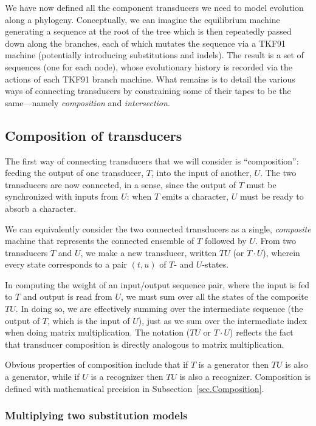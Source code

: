 \documentclass{article}
\newcommand{\secref}[1]{Subsection~\ref{sec.#1}}
\newcommand{\seclabel}[1]{\label{sec.#1}}
\begin{document}
We have now defined all the component transducers we need to model evolution along a phylogeny. 
Conceptually, we can imagine the equilibrium machine generating a sequence at the root of the
tree which is then repeatedly passed down along the branches, each of which mutates the sequence
via a TKF91 machine (potentially introducing substitutions and indels). 
The result is a set of sequences (one  for each node),
  whose evolutionary history is recorded via  
the actions of each TKF91  branch machine.  
What remains is to detail the various ways of connecting transducers by
 constraining some of their tapes to be the same---namely {\em composition} and {\em intersection}.

\subsection{Composition of transducers}
\seclabel{Tutorial.Composition}
The first way of connecting transducers that we will consider is  ``composition'':
feeding the output of one transducer, $T$, into the input of another, $U$.
The two transducers are now connected, in a sense, since the output of $T$ must be
 synchronized with inputs from $U$: when $T$ emits a character, $U$ must be ready to absorb a character.  

We can equivalently  consider the two connected transducers as
a single, {\em composite} machine that represents
 the connected ensemble of $T$ followed by $U$.  
From two transducers $T$ and $U$,
we make a new transducer, written $TU$ (or $T \cdot U$),
wherein every state corresponds to a pair $(t,u)$ of $T$- and $U$-states.  
 
In computing the weight of an input/output sequence pair, where the input is fed to $T$ and
output is read from $U$, we must sum over all the states of the composite $TU$.  
In doing so, we are effectively summing over the intermediate sequence
(the output of $T$, which is the input of $U$),
just as we sum over the intermediate index when doing matrix multiplication.
The notation ($TU$ or $T \cdot U$) reflects the fact that transducer composition is  directly 
analogous to  matrix multiplication.  

Obvious properties of composition include that
if $T$ is a generator then $TU$ is also a generator, while
if $U$ is a recognizer then $TU$ is also a recognizer.
Composition is defined with mathematical precision in \secref{Composition}. 

\subsubsection{Multiplying two substitution models}
\end{document}
